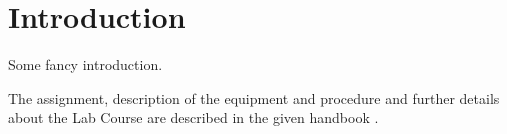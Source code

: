 
\chapter{Introduction}
\label{chap:intro}

Some fancy introduction.

The assignment, description of the equipment and procedure and further details about the Lab Course are described in the given handbook \autocite{klevanskyTDLASTunableLaser2021}.